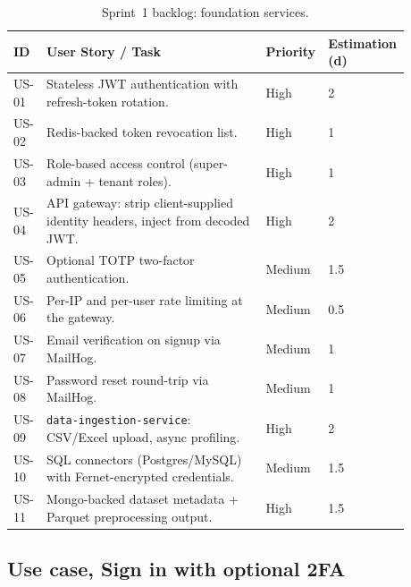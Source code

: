 \documentclass[12pt, a4paper, oneside]{report}
\begin{document}
\begin{table}[H]
\centering
\caption{Sprint~1 backlog: foundation services.}
\label{tab:sprint1_backlog}
\begin{tabular}{|p{0.05\linewidth}|L{0.55\linewidth}|p{0.1\linewidth}|p{0.18\linewidth}|}
\hline
\textbf{ID} & \textbf{User Story / Task} & \textbf{Priority} & \textbf{Estimation (d)} \\
\hline
US-01 & Stateless JWT authentication with refresh-token rotation. & High & 2 \\ \hline
US-02 & Redis-backed token revocation list. & High & 1 \\ \hline
US-03 & Role-based access control (super-admin + tenant roles). & High & 1 \\ \hline
US-04 & API gateway: strip client-supplied identity headers, inject from decoded JWT. & High & 2 \\ \hline
US-05 & Optional TOTP two-factor authentication. & Medium & 1.5 \\ \hline
US-06 & Per-IP and per-user rate limiting at the gateway. & Medium & 0.5 \\ \hline
US-07 & Email verification on signup via MailHog. & Medium & 1 \\ \hline
US-08 & Password reset round-trip via MailHog. & Medium & 1 \\ \hline
US-09 & \texttt{data-ingestion-service}: CSV/Excel upload, async profiling. & High & 2 \\ \hline
US-10 & SQL connectors (Postgres/MySQL) with Fernet-encrypted credentials. & Medium & 1.5 \\ \hline
US-11 & Mongo-backed dataset metadata + Parquet preprocessing output. & High & 1.5 \\
\hline
\end{tabular}
\end{table}

\subsection{Use case, Sign in with optional 2FA}
\end{document}
